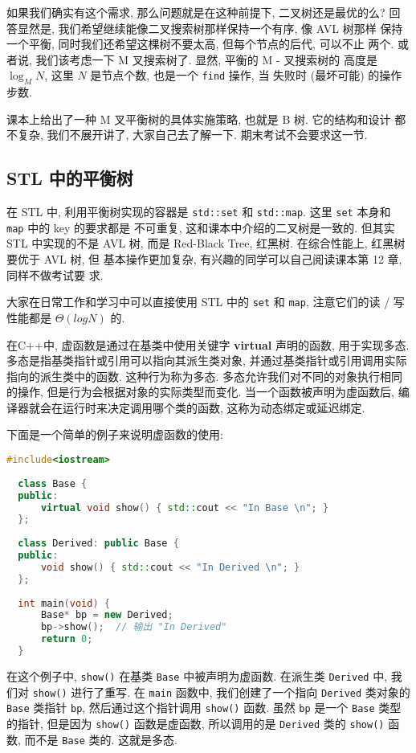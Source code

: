 \documentclass[a4paper]{ctexart}
\theoremstyle{definition}
\theoremstyle{definition}
\begin{document}
如果我们确实有这个需求, 那么问题就是在这种前提下, 二叉树还是最优的么?
回答显然是, 我们希望继续能像二叉搜索树那样保持一个有序, 像 AVL 树那样
保持一个平衡, 同时我们还希望这棵树不要太高, 但每个节点的后代, 可以不止
两个. 或者说, 我们该考虑一下 M 叉搜索树了. 显然, 平衡的 M - 叉搜索树的
高度是 $\log_M N$, 这里 $N$ 是节点个数, 也是一个 \verb|find| 操作, 当
失败时 (最坏可能) 的操作步数. 

课本上给出了一种 M 叉平衡树的具体实施策略, 也就是 B 树. 它的结构和设计
都不复杂, 我们不展开讲了, 大家自己去了解一下. 期末考试不会要求这一节.

\subsection{STL 中的平衡树}

在 STL 中, 利用平衡树实现的容器是 \verb|std::set| 和
\verb|std::map|. 这里 \verb|set| 本身和 \verb|map| 中的 key 的要求都是
不可重复, 这和课本中介绍的二叉树是一致的. 但其实 STL 中实现的不是 AVL
树, 而是 Red-Black Tree, 红黑树. 在综合性能上, 红黑树要优于 AVL 树, 但
基本操作更加复杂, 有兴趣的同学可以自己阅读课本第 12 章, 同样不做考试要
求.

大家在日常工作和学习中可以直接使用 STL 中的 \verb|set| 和 \verb|map|,
注意它们的读 / 写性能都是 $\Theta(log N)$ 的.

在C++中, 虚函数是通过在基类中使用关键字 {\bfseries virtual} 声明的函数, 用于实现多态. 
多态是指基类指针或引用可以指向其派生类对象, 并通过基类指针或引用调用实际指向的派生类中的函数. 
这种行为称为多态. 多态允许我们对不同的对象执行相同的操作, 但是行为会根据对象的实际类型而变化.
当一个函数被声明为虚函数后, 编译器就会在运行时来决定调用哪个类的函数, 这称为动态绑定或延迟绑定. 

下面是一个简单的例子来说明虚函数的使用:
\begin{lstlisting}[language=c++]
  #include<iostream>  
  
  class Base {  
  public:  
      virtual void show() { std::cout << "In Base \n"; }  
  };  
    
  class Derived: public Base {  
  public:  
      void show() { std::cout << "In Derived \n"; }  
  };  
    
  int main(void) {   
      Base* bp = new Derived;  
      bp->show();  // 输出 "In Derived"  
      return 0;  
  }      
\end{lstlisting}

在这个例子中, \verb|show()| 在基类 \verb|Base| 中被声明为虚函数. 
在派生类 \verb|Derived| 中, 我们对 \verb|show()| 进行了重写. 在 \verb|main| 函数中, 
我们创建了一个指向 \verb|Derived| 类对象的 \verb|Base| 类指针 \verb|bp|, 
然后通过这个指针调用 \verb|show()| 函数. 虽然 \verb|bp| 是一个 \verb|Base| 类型的指针, 
但是因为 \verb|show()| 函数是虚函数, 所以调用的是 \verb|Derived| 类的 \verb|show()| 函数, 
而不是 \verb|Base| 类的. 这就是多态. 
\end{document}
